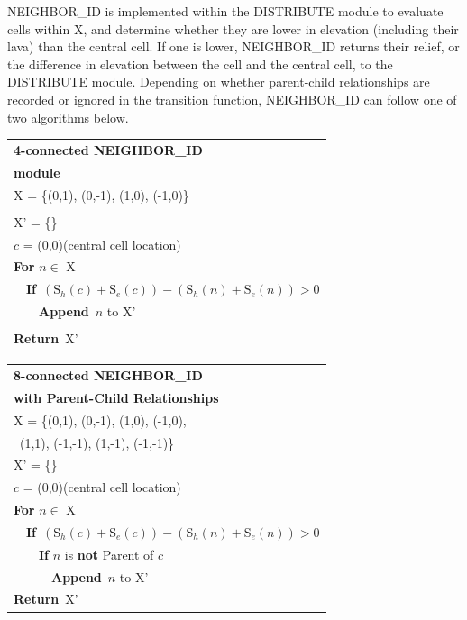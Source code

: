 \documentclass[12pt,letter]{article}
\begin{document}
		NEIGHBOR\_ID is implemented within the DISTRIBUTE module to evaluate cells within X, and determine whether they are lower in elevation (including their lava) than the central cell. If one is lower, NEIGHBOR\_ID returns their relief, or the difference in elevation between the cell and the central cell, to the DISTRIBUTE module. Depending on whether parent-child relationships are recorded or ignored in the transition function, NEIGHBOR\_ID can follow one of two algorithms below.
		\begin{center}
		\begin{tabular}{l}
			\toprule
			\textbf{4-connected NEIGHBOR\_ID}\\
			\textbf{module}\\
			\midrule
			X = \{(0,1), (0,-1), (1,0), (-1,0)\}\\\\
			X' = \{\}\\
			$c$ = (0,0)\qquad (central cell location)\\
			\textbf{For} $n\in$ X\\
			~~\textbf{If}~$(\text{S}_h(c)+\text{S}_e(c))-(\text{S}_h(n)+\text{S}_e(n)) > 0$\\
			~~~~\textbf{Append}~$n$ to X'\\\\
			\textbf{Return}~X'\\
			\bottomrule
		\end{tabular}
		\begin{tabular}{l}
			\toprule
			\textbf{8-connected NEIGHBOR\_ID}\\
			\textbf{with Parent-Child Relationships}\\
			\midrule
			X = \{(0,1), (0,-1), (1,0), (-1,0), \\
			\qquad~(1,1), (-1,-1), (1,-1), (-1,-1)\}\\
			X' = \{\}\\
			$c$ = (0,0)\qquad (central cell location)\\
			\textbf{For} $n\in$ X\\
			~~\textbf{If}~$(\text{S}_h(c)+\text{S}_e(c))-(\text{S}_h(n)+\text{S}_e(n)) > 0$\\
			~~~~\textbf{If} $n$ is \textbf{not} Parent of $c$\\
			~~~~~~\textbf{Append}~$n$ to X'\\
			\textbf{Return}~X'\\
			\bottomrule
		\end{tabular}
		\end{center}
\end{document}
